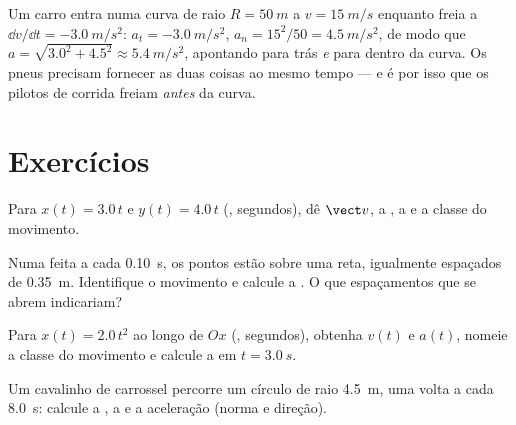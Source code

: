 \begin{example}\label{ex:g12:kinematics-2d:bend}
Um carro entra numa curva de raio $R = \qty{50}{m}$ a $v = \qty{15}{m/s}$
enquanto freia a $\dd v/\dd t = \qty{-3.0}{m/s^2}$:
$a_t = \qty{-3.0}{m/s^2}$, $a_n = 15^2/50 = \qty{4.5}{m/s^2}$, de modo
que $a = \sqrt{3.0^2 + 4.5^2} \approx \qty{5.4}{m/s^2}$, apontando para
trás \emph{e} para dentro da curva. Os pneus precisam fornecer as duas
coisas ao mesmo tempo --- e é por isso que os pilotos de corrida freiam
\emph{antes} da curva.
\end{example}

\section{Exercícios}

\begin{exercise}[$\star$]\label{exo:g12:kinematics-2d:1}
Para $x(t) = 3.0\,t$ e $y(t) = 4.0\,t$ (, segundos), dê $\vect v$,
a , a  e a classe do movimento.
\end{exercise}

\begin{exercise}[$\star$]\label{exo:g12:kinematics-2d:2}
Numa  feita a cada \qty{0.10}{s}, os pontos estão sobre
uma reta, igualmente espaçados de \qty{0.35}{m}. Identifique o movimento
e calcule a . O que espaçamentos que se abrem
indicariam?
\end{exercise}

\begin{exercise}[$\star$]\label{exo:g12:kinematics-2d:3}
Para $x(t) = 2.0\,t^2$ ao longo de $Ox$ (, segundos), obtenha
$v(t)$ e $a(t)$, nomeie a classe do movimento e calcule a  em $t = \qty{3.0}{s}$.
\end{exercise}

\begin{exercise}[$\star$]\label{exo:g12:kinematics-2d:4}
Um cavalinho de carrossel percorre um círculo de raio \qty{4.5}{m}, uma
volta a cada \qty{8.0}{s}: calcule a , a  e a
aceleração (norma e direção).
\end{exercise}

